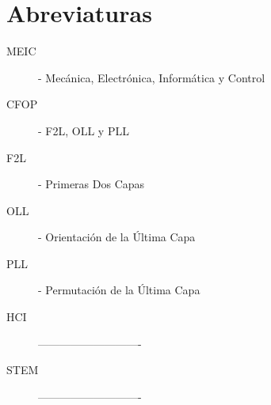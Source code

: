 \chapter{Abreviaturas}

\begin{description}
    \item[MEIC\hfill] - Mecánica, Electrónica, Informática y Control 
    \item[CFOP\hfill] - F2L, OLL y PLL
    \item[F2L\hfill] - Primeras Dos Capas
    \item[OLL\hfill] - Orientación de la Última Capa
    \item[PLL\hfill] - Permutación de la Última Capa
    \item[HCI\hfill] ----------------------------
    \item[STEM\hfill] ----------------------------

    
    
\end{description}

